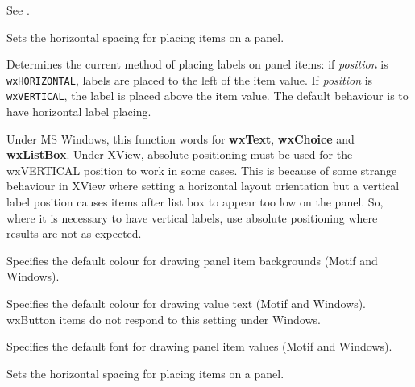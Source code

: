 See .



Sets the horizontal spacing for placing items on a panel.



Determines the current method of placing labels on panel items: if {\it
position} is {\tt wxHORIZONTAL}, labels are placed to the left of the
item value. If {\it position} is {\tt wxVERTICAL}, the label is placed
above the item value. The default behaviour is to have horizontal label
placing.

Under MS Windows, this function words for {\bf wxText}, {\bf wxChoice}\rtfsp
and {\bf wxListBox}. Under XView, absolute positioning must be used
for the wxVERTICAL position to work in some cases. This is because of
some strange behaviour in XView where setting a horizontal layout
orientation but a vertical label position causes items after list box
to appear too low on the panel. So, where it is necessary to have
vertical labels, use absolute positioning where results are not as
expected.



Specifies the default colour for drawing panel item backgrounds (Motif and Windows).



Specifies the default colour for drawing value text (Motif and Windows).
wxButton items do not respond to this setting under Windows.



Specifies the default font for drawing panel item values (Motif and Windows).



Sets the horizontal spacing for placing items on a panel.

